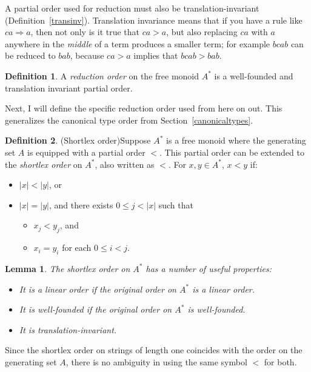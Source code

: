 \documentclass[headsepline,bibliography=totoc]{scrreport}
\newtheorem{lemma}{Lemma}[chapter]
\theoremstyle{definition}
\theoremstyle{definition}
\newtheorem{definition}{Definition}[chapter]
\theoremstyle{definition}
\begin{document}
A partial order used for reduction must also be translation-invariant (Definition~\ref{transinv}). Translation invariance means that if you have a rule like $ca\Rightarrow a$, then not only is it true that $ca>a$, but also replacing $ca$ with $a$ anywhere in the \emph{middle} of a term produces a smaller term; for example $bcab$ can be reduced to $bab$, because $ca>a$ implies that $bcab>bab$.
\begin{definition}A \emph{reduction order} on the free monoid $A^*$ is a well-founded and translation invariant partial order.
\end{definition}
Next, I will define the specific reduction order used from here on out. This generalizes the canonical type order from Section~\ref{canonicaltypes}.

\begin{definition}(Shortlex order)\label{shortlex}
Suppose $A^*$ is a free monoid where the generating set $A$ is equipped with a partial order $<$. This partial order can be extended to the \emph{shortlex order} on $A^*$, also written as $<$. For $x, y\in A^*$, $x<y$ if:
\begin{itemize}
\item $|x|<|y|$, or
\item $|x|=|y|$, and there exists $0\le j<|x|$ such that
\begin{itemize}
\item $x_j<y_j$, and
\item $x_i=y_i$ for each $0\le i<j$.
\end{itemize}
\end{itemize}
\end{definition}
\begin{lemma} The shortlex order on $A^*$ has a number of useful properties:
\begin{itemize}
\item It is a linear order if the original order on $A^*$ is a linear order.
\item It is well-founded if the original order on $A^*$ is well-founded.
\item It is translation-invariant.
\end{itemize}
\end{lemma}
Since the shortlex order on strings of length one coincides with the order on the generating set $A$, there is no ambiguity in using the same symbol $<$ for both.
\end{document}

